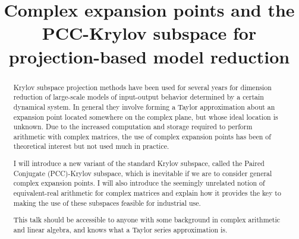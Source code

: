 \documentclass{article}
\title{Complex expansion points and the PCC-Krylov subspace for projection-based model reduction}
\begin{document}
\maketitle
\begin{abstract}
Krylov subspace projection methods have been used for several years for
dimension reduction of large-scale models of input-output behavior
determined by a certain dynamical system.  In general they involve
forming
a Taylor approximation about an expansion point located somewhere on the
complex plane, but whose ideal location is unknown. Due to the increased
computation and storage required to perform arithmetic with complex
matrices, the use of complex expansion points has been of theoretical
interest but not used much in practice.

I will introduce a new variant of the standard Krylov subspace, called
the Paired Conjugate (PCC)-Krylov subspace, which is inevitable if we
are to consider general complex expansion points.  I will also introduce
the seemingly unrelated notion of equivalent-real arithmetic for complex
matrices and explain how it provides the key to making the use of these
subspaces feasible for industrial use.

This talk should be accessible to anyone with some background in complex
arithmetic and linear algebra, and knows what a Taylor series
approximation is.
\end{abstract}
\end{document}
